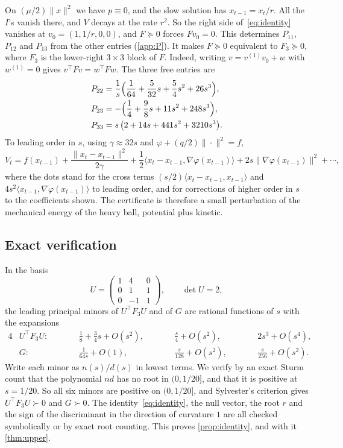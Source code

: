 \documentclass[11pt, a4paper]{article}
\theoremstyle{definition}
\begin{document}
On $(\mu/2)\|x\|^2$ we have $p\equiv0$, and the slow solution has $x_{t-1}=x_t/r$. All the $I$'s vanish there,
and $V$ decays at the rate $r^2$. So the right side of~\eqref{eq:identity} vanishes at $v_0=(1,1/r,0,0)$, and
$F\succeq0$ forces $Fv_0=0$. This determines $P_{11}$, $P_{12}$ and $P_{13}$ from the other entries (\cref{app:P}). It
makes $F\succeq0$ equivalent to $F_3\succeq0$, where $F_3$ is the lower-right $3\times3$ block of $F$. Indeed,
writing $v=v^{(1)}v_0+w$ with $w^{(1)}=0$ gives $v^\top Fv=w^\top Fw$. The three free entries are
\begin{align*}
  P_{22}&=\frac1s\Bigl(\frac1{64}+\frac{5}{32}s+\frac54s^2+26s^3\Bigr),\\
  P_{23}&=-\Bigl(\frac14+\frac98s+11s^2+248s^3\Bigr),\\
  P_{33}&=s\,\bigl(2+14s+441s^2+3210s^3\bigr).
\end{align*}
To leading order in $s$, using $\gamma\approx32s$ and $\varphi+(q/2)\|\cdot\|^2=f$,
\begin{equation}
  V_t=f(x_{t-1})+\frac{\|x_t-x_{t-1}\|^2}{2\gamma}+\frac12\langle x_t-x_{t-1},\nabla\varphi(x_{t-1})\rangle
  +2s\|\nabla\varphi(x_{t-1})\|^2+\cdots,
  \label{eq:energy}
\end{equation}
where the dots stand for the cross terms $(s/2)\langle x_t-x_{t-1},x_{t-1}\rangle$ and
$4s^2\langle x_{t-1},\nabla\varphi(x_{t-1})\rangle$ to leading order, and for corrections of higher order in $s$ to the
coefficients shown. The certificate is therefore a small perturbation of the mechanical energy of the heavy ball,
potential plus kinetic.

\subsection{Exact verification}
\label{sec:verification}

In the basis
\[
  U=\begin{pmatrix}1&4&0\\0&1&1\\0&-1&1\end{pmatrix},\qquad\det U=2,
\]
the leading principal minors of $U^\top F_3U$ and of $G$ are rational functions of $s$ with the expansions
\begin{alignat*}{4}
  &U^\top F_3U:&\qquad &\frac18+\frac34s+O(s^2),&\qquad &\frac s4+O(s^2),&\qquad &2s^3+O(s^4),\\
  &G:& &\frac1{64s}+O(1),& &\frac s{128}+O(s^2),& &\frac s{256}+O(s^2).
\end{alignat*}
Write each minor as $n(s)/d(s)$ in lowest terms. We verify by an exact Sturm count that the polynomial $nd$ has no root in $(0,1/20]$, and
that it is positive at $s=1/20$. So all six minors are positive on $(0,1/20]$, and Sylvester's criterion gives
$U^\top F_3U\succ0$ and $G\succ0$. The identity~\eqref{eq:identity}, the null vector, the root $r$ and the sign of the
discriminant in the direction of curvature $1$ are all checked symbolically or by exact root counting. This proves
\cref{prop:identity}, and with it \cref{thm:upper}.
\end{document}
